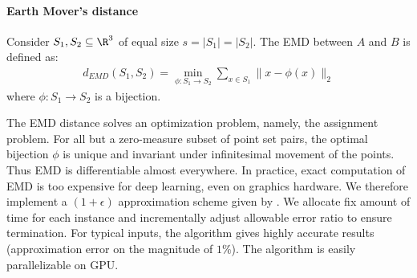 \documentclass[10pt,twocolumn,letterpaper]{article}
\begin{document}
\paragraph{Earth Mover's distance}Consider $S_1, S_2\subseteq \R^3$ of equal size $s=|S_1|=|S_2|$. The EMD between $A$ and $B$ is defined as:
\begin{align*}
d_{EMD}(S_1, S_2)=\min_{\phi:S_1\rightarrow S_2} \sum_{x\in S_1} \|x-\phi(x)\|_2
\end{align*}
where $\phi:S_1\rightarrow S_2$ is a bijection.

The EMD distance solves an optimization problem, namely, the assignment problem. For all but a zero-measure subset of point set pairs, the optimal bijection $\phi$ is unique and invariant under infinitesimal movement of the points. Thus EMD is differentiable almost everywhere. In practice, exact computation of EMD is too expensive for deep learning, even on graphics hardware. We therefore implement a $(1+\epsilon)$ approximation scheme given by \cite{bertsekas1985distributed}. We allocate fix amount of time for each instance and incrementally adjust allowable error ratio to ensure termination. For typical inputs, the algorithm gives highly accurate results (approximation error on the magnitude of $1\%$). The algorithm is easily parallelizable on GPU.
\end{document}

